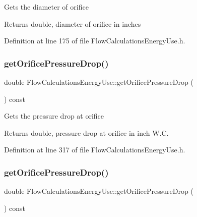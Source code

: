 Gets the diameter of orifice

\begin{DoxyReturn}{Returns}
double, diameter of orifice in inches 
\end{DoxyReturn}


Definition at line 175 of file Flow\+Calculations\+Energy\+Use.\+h.

\mbox{\label{class_flow_calculations_energy_use_ac42e5918bba0c56406f39437317a2a87}} 
\subsubsection{\texorpdfstring{get\+Orifice\+Pressure\+Drop()}{getOrificePressureDrop()}\hspace{0.1cm}{\footnotesize\ttfamily [1/3]}}
{\footnotesize\ttfamily double Flow\+Calculations\+Energy\+Use\+::get\+Orifice\+Pressure\+Drop (\begin{DoxyParamCaption}{ }\end{DoxyParamCaption}) const\hspace{0.3cm}{\ttfamily [inline]}}

Gets the pressure drop at orifice

\begin{DoxyReturn}{Returns}
double, pressure drop at orifice in inch W.\+C. 
\end{DoxyReturn}


Definition at line 317 of file Flow\+Calculations\+Energy\+Use.\+h.

\mbox{\label{class_flow_calculations_energy_use_ac42e5918bba0c56406f39437317a2a87}} 
\subsubsection{\texorpdfstring{get\+Orifice\+Pressure\+Drop()}{getOrificePressureDrop()}\hspace{0.1cm}{\footnotesize\ttfamily [2/3]}}
{\footnotesize\ttfamily double Flow\+Calculations\+Energy\+Use\+::get\+Orifice\+Pressure\+Drop (\begin{DoxyParamCaption}{ }\end{DoxyParamCaption}) const\hspace{0.3cm}{\ttfamily [inline]}}

